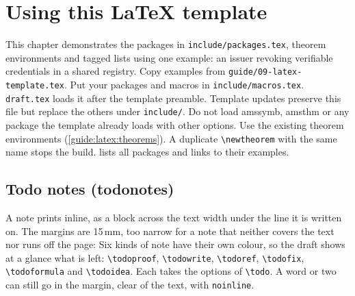 \chapter{Using this \LaTeX{} template}\label{guide:latex}
This chapter demonstrates the packages in \texttt{include/packages.tex}, theorem environments and tagged lists using one example: an issuer revoking verifiable credentials in a shared registry.
Copy examples from \texttt{guide/09-latex-template.tex}.
Put your packages and macros in \texttt{include/macros.tex}. \texttt{draft.tex} loads it after the template preamble. Template updates preserve this file but replace the others under \texttt{include/}.
Do not load amssymb, amsthm or any package the template already loads with other options. Use the existing theorem environments (\cref{guide:latex:theorems}). A duplicate \texttt{\textbackslash newtheorem} with the same name stops the build.
 lists all packages and links to their examples.

\section{Todo notes (todonotes)}\label{guide:latex:todo}
A note prints inline, as a block across the text width under the line it is written on. The margins are 15\,mm, too narrow for a note that neither covers the text nor runs off the page:
Six kinds of note have their own colour, so the draft shows at a glance what is left: \texttt{\textbackslash todoproof}, \texttt{\textbackslash todowrite}, \texttt{\textbackslash todoref}, \texttt{\textbackslash todofix}, \texttt{\textbackslash todoformula} and \texttt{\textbackslash todoidea}. Each takes the options of \texttt{\textbackslash todo}.
A word or two can still go in the margin, clear of the text, with \texttt{noinline}.

